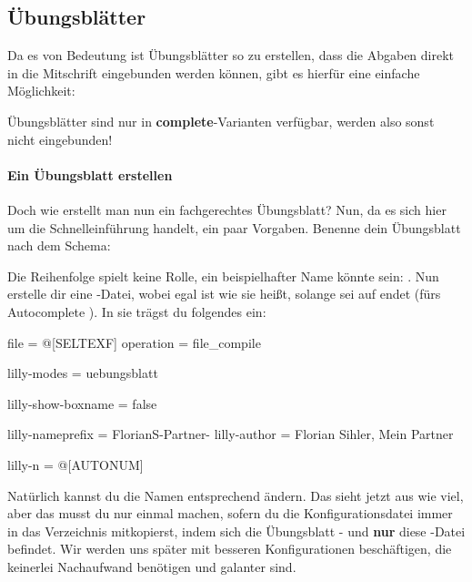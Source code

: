\subsection{Übungsblätter}
Da es von Bedeutung ist Übungsblätter so zu erstellen, dass die Abgaben direkt in die Mitschrift eingebunden werden können, gibt es hierfür eine einfache Möglichkeit:
\begin{latex}

\clearpage
\begin{uebungsblatt}[Mengen][1]
\end{uebungsblatt}
\newpage
\end{latex}
Übungsblätter sind nur in \textbf{complete}-Varianten verfügbar, werden also sonst nicht eingebunden! \paragraph{Ein Übungsblatt erstellen}
Doch wie erstellt man nun ein fachgerechtes Übungsblatt? Nun, da es sich hier um die Schnelleinführung handelt, ein paar Vorgaben. Benenne dein Übungsblatt nach dem Schema: \begin{center}
\end{center}
Die Reihenfolge spielt keine Rolle, ein beispielhafter Name könnte sein: \newline{}. Nun erstelle dir eine -Datei, wobei egal ist wie sie heißt, solange sei auf  endet (fürs Autocomplete \Smiley). In sie trägst du folgendes ein:
\begin{gepard}
file        = @[SELTEXF]
operation   = file_compile

lilly-modes = uebungsblatt

lilly-show-boxname = false

lilly-nameprefix = FlorianS-Partner-
lilly-author = Florian Sihler, Mein Partner

lilly-n = @[AUTONUM]
\end{gepard}
Natürlich kannst du die Namen entsprechend ändern. Das sieht jetzt aus wie viel, aber das musst du nur einmal machen, sofern du die Konfigurationsdatei immer in das Verzeichnis mitkopierst, indem sich die Übungsblatt - und \textbf{nur} diese -Datei befindet. Wir werden uns später %
mit besseren Konfigurationen beschäftigen, die keinerlei Nachaufwand benötigen und galanter sind.
